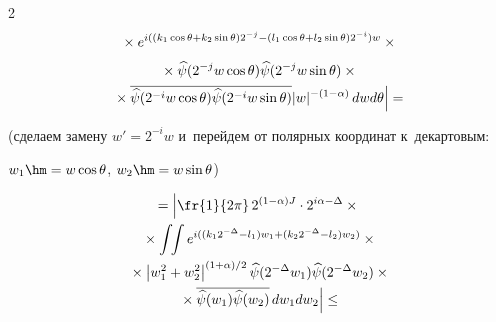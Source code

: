 \begin{multicols}{2}
\begin{multline*}
\left. {}\times e^{i((k_1\cos\theta+k_2\sin\theta) 2^{-j} -


 (l_1\cos\theta+l_2\sin\theta) 2^{-i}) w} \times{}\right.


\\[3pt]


{}\times \widehat{\psi}(2^{-j}w\cos\theta)


\widehat{\psi}(2^{-j}w\sin\theta) \times{}\\


\left.{}\times \overline{ \widehat{\psi}(2^{-i}w\cos\theta)


\widehat{\psi}(2^{-i}w\sin\theta)} |w|^{-(1-\alpha)} \,d w d\theta


\vphantom{\fr{1}{2\pi}}\right\vert={}


\end{multline*}





\vspace*{-2pt}





\noindent


(сделаем замену $w' = 2^{-i} w$ и~перейдем от полярных координат к~декартовым:


$w_1 \hm= w \cos\theta$, $w_2 \hm= w\sin\theta$)


%


\begin{multline*}


=\left\vert \fr{1}{2\pi}\, 2^{(1-\alpha)J}\cdot 2^{i\alpha-\Delta}\times{}\right.\\


{}\times \int\!\! \int


e^{i((k_1 2^{-\Delta} - l_1) w_1+(k_2 2^{-\Delta} - l_2) w_2 )} \times{}


\\


{}\times \left\vert w_1^2 +w_2^2\right\vert^{(1+\alpha)/2} \widehat{\psi}(2^{-\Delta}w_1)


 \widehat{\psi}(2^{-\Delta}w_2) \times{}\\


\left. {}\times\overline{ \widehat{\psi}(w_1) \widehat{\psi}(w_2)}\,  d w_1 d w_2


\vphantom{\fr{1}{2\pi}}\right\vert \leq{}


\end{multline*}









\end{multicols}
